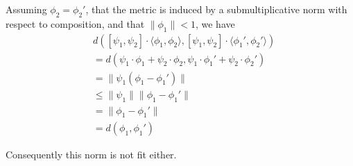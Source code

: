 \documentclass[10pt,a4paper]{amsart}
\theoremstyle{definition}
\theoremstyle{definition}
\theoremstyle{definition}
\theoremstyle{definition}
\theoremstyle{definition}
\theoremstyle{definition}
\begin{document}
Assuming \(\phi_2 = \phi_2'\), that the metric is induced by a submultiplicative norm with respect to composition, and that \(\|\phi_1\| < 1\), we have
\begin{align*}
  & d([\psi_1, \psi_2] \cdot \langle \phi_1, \phi_2 \rangle, [\psi_1, \psi_2] \cdot \langle \phi_1', \phi_2' \rangle ) \\
  & = d(\psi_1 \cdot \phi_1 + \psi_2 \cdot \phi_2, \psi_1 \cdot \phi_1' + \psi_2 \cdot \phi_2') \\
  & = \lVert \psi_1 (\phi_1- \phi_1' ) \lVert \\
  & \leq    \lVert \psi_1  \lVert  \lVert \phi_1- \phi_1'  \lVert \\
  & = \lVert \phi_1- \phi_1'  \lVert  \\
    & =  d(\phi_1, \phi_1' )
\end{align*}

Consequently this norm is not fit either.
\end{document}
